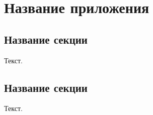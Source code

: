 
\chapter{Название приложения}
\label{app1}

\section{Название секции}
\label{app1:sec1}

Текст.

\section{Название секции}
\label{app1:sec2}

Текст.

